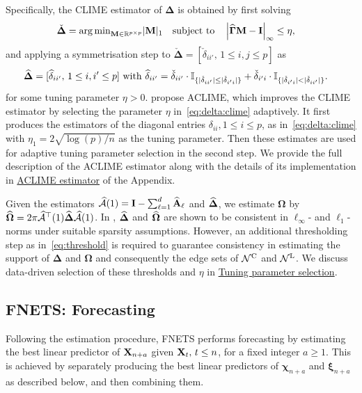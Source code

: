 Specifically, the CLIME estimator of $\bm\Delta$ is obtained by first solving
\begin{align}
\label{eq:clime}
\check{\bm\Delta} & = {\arg\min}_{\mathbf M \in \mathbb{R}^{p \times p}} \vert \mathbf M \vert_1 
\quad \text{subject to} \quad
\left\vert \widehat{\bm\Gamma} \mathbf M - \mathbf I \right\vert_\infty \le \eta,
\end{align}
and applying a symmetrisation step to $\check{\bm\Delta} = [\check\delta_{ii'}, \, 1 \le i, j \le p]$ as
\begin{align} 
\label{eq:delta:clime}
\widehat{\bm\Delta} &= [\widehat\delta_{ii'}, \, 1 \le i, i' \le p]
\text{ with } 
\widehat\delta_{ii'} = \check\delta_{ii'} \cdot \mathbb{I}_{\{\vert \check\delta_{ii'} \vert
\le \vert \check\delta_{i'i} \vert \}}
+ \check\delta_{i'i} \cdot \mathbb{I}_{\{\vert \check\delta_{i'i} \vert
< \vert \check\delta_{ii'} \vert \}}.
\end{align}
for some tuning parameter $\eta > 0$.
\cite{cai2016estimating} propose ACLIME, which improves the CLIME estimator by selecting the parameter $\eta$ in~\eqref{eq:delta:clime} adaptively.
It first produces the estimators of the diagonal entries $\delta_{ii}, 1 \le i \le p$, as in~\eqref{eq:delta:clime} with $\eta_1 = 2 \sqrt{\log (p) / n}$ as the tuning parameter.
Then these estimates are used for adaptive tuning parameter selection in the second step.
We provide the full description of the ACLIME estimator along with the details of its implementation in \hyperref[sec:aclime]{ACLIME estimator} of the Appendix.

Given the estimators $\widehat{\mathcal A}(1) = \mathbf I - \sum_{\ell = 1}^d \widehat{\mathbf A}_\ell$ and $\widehat{\bm\Delta}$, we estimate $\bm\Omega$ by $\widehat{\bm\Omega} = 2\pi \widehat{\mathcal A}^\top(1) \widehat{\bm\Delta} \widehat{\mathcal A}(1)$.
In \cite{barigozzi2022fnets}, $\widehat{\bm\Delta}$ and $\widehat{\bm\Omega}$ are shown to be consistent in $\ell_\infty$- and $\ell_1$-norms under suitable sparsity assumptions.
However, an additional thresholding step as in~\eqref{eq:threshold} is required to guarantee consistency in estimating the support of $\bm\Delta$ and $\bm\Omega$ and consequently the edge sets of $\mathcal N^{\text{\upshape{C}}}$ and $\mathcal N^{\text{\upshape{L}}}$.
We discuss data-driven selection of these thresholds and $\eta$ in \hyperref[sec:tuning]{Tuning parameter selection}.

\subsection{FNETS: Forecasting}

Following the estimation procedure, FNETS performs forecasting by estimating the best linear predictor of $\mathbf X_{n + a}$ given $\mathbf X_t, \, t \le n$, for a fixed integer $a \ge 1$.
This is achieved by separately producing the best linear predictors of $\bm\chi_{n + a}$ and $\bm\xi_{n + a}$ as described below, and then combining them.


